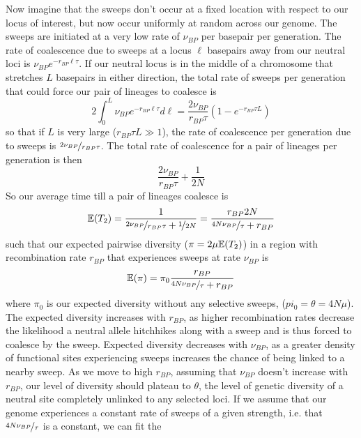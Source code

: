 Now imagine that the sweeps don't occur at a fixed location with
respect to our locus of interest, but now occur uniformly at random
across our genome. The sweeps are initiated at a very low rate of
$\nu_{BP}$ per basepair per generation. The rate of coalescence due to
sweeps at a locus $\ell$ basepairs away from our neutral loci is
$\nu_{BP} e^{-r_{BP} \ell \tau}$. If our neutral locus is in the
middle of a chromosome that stretches $L$ basepairs in either direction,
the total rate of sweeps per generation that could force our pair of lineages to coalesce is
\begin{equation}
2\int_0^{L} \nu_{BP} e^{-r_{BP} \ell \tau} d \ell =
\frac{2\nu_{BP}}{r_{BP} \tau} \left(1-e^{-r_{BP} \tau L} \right)
\end{equation}
so that if $L$ is very large ($r_{BP} \tau L \gg 1$), the rate of coalescence per
generation due to sweeps is $\nicefrac{2\nu_{BP}}{r_{BP} \tau}$. The total rate
of coalescence for a pair of lineages per generation is then
\begin{equation}
\frac{2\nu_{BP}}{r_{BP} \tau}+\frac{1}{2N}
\end{equation}
So our average time till a pair of lineages coalesce is
\begin{equation}
\mathbb{E}(T_2) = \frac{1}{\nicefrac{2\nu_{BP}}{r_{BP} \tau}+\nicefrac{1}{2N}} = \frac{r_{BP}2N}{\nicefrac{4N\nu_{BP}}{ \tau}+r_{BP}}
\end{equation}
such that our expected pairwise diversity ($\pi=2\mu\mathbb{E}(T_2)$) in a region with
recombination rate $r_{BP}$ that experiences sweeps at rate $\nu_{BP}$
is  
\begin{equation}
\mathbb{E}(\pi) = \pi_0 \frac{r_{BP}}{\nicefrac{4N\nu_{BP}}{ \tau}+r_{BP}} \label{eqn:pi_GW_HH}
\end{equation}
where $\pi_0$ is our expected diversity without any selective sweeps, ($pi_0=\theta=4N\mu$).  The expected diversity increases with $r_{BP}$, as higher
recombination rates decrease the likelihood a neutral allele hitchhikes along with a sweep and is thus forced to
coalesce by the sweep. Expected diversity decreases with $\nu_{BP}$, as
a greater density of functional sites experiencing sweeps increases the chance of
being linked to a nearby sweep. As we move to high $r_{BP}$, assuming
that $\nu_{BP}$ doesn't increase with $r_{BP}$, our level of diversity
should plateau to $\theta$, the level of genetic diversity of a
neutral site completely unlinked to any selected loci. If we assume
that our genome experiences a constant rate of sweeps of a given
strength, i.e. that $\nicefrac{4N\nu_{BP}}{ \tau}$ is a constant, we can fit the
